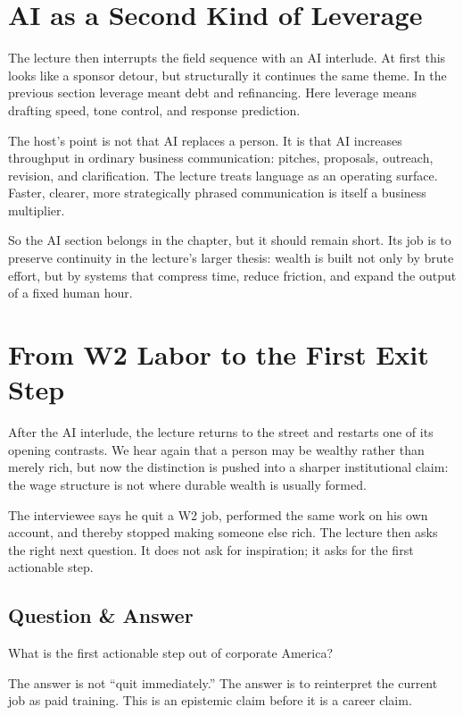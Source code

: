 \section{AI as a Second Kind of Leverage}

The lecture then interrupts the field sequence with an AI interlude. At first this looks like a sponsor detour, but structurally it continues the same theme. In the previous section leverage meant debt and refinancing. Here leverage means drafting speed, tone control, and response prediction.

The host's point is not that AI replaces a person. It is that AI increases throughput in ordinary business communication: pitches, proposals, outreach, revision, and clarification. The lecture treats language as an operating surface. Faster, clearer, more strategically phrased communication is itself a business multiplier.

So the AI section belongs in the chapter, but it should remain short. Its job is to preserve continuity in the lecture's larger thesis: wealth is built not only by brute effort, but by systems that compress time, reduce friction, and expand the output of a fixed human hour.

\section{From W2 Labor to the First Exit Step}

After the AI interlude, the lecture returns to the street and restarts one of its opening contrasts. We hear again that a person may be wealthy rather than merely rich, but now the distinction is pushed into a sharper institutional claim: the wage structure is not where durable wealth is usually formed.

The interviewee says he quit a W2 job, performed the same work on his own account, and thereby stopped making someone else rich. The lecture then asks the right next question. It does not ask for inspiration; it asks for the first actionable step.

\subsection{Question \& Answer}

What is the first actionable step out of corporate America?

The answer is not ``quit immediately.'' The answer is to reinterpret the current job as paid training. This is an epistemic claim before it is a career claim.

